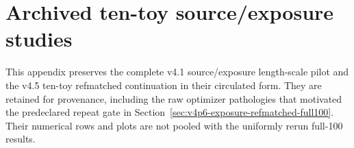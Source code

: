 \clearpage
\section{Archived ten-toy source/exposure studies}
\label{app:v4p5-ten-toy-source-exposure}

This appendix preserves the complete v4.1 source/exposure length-scale pilot and the
v4.5 ten-toy refmatched continuation in their circulated form.  They are retained for
provenance, including the raw optimizer pathologies that motivated the predeclared
repeat gate in Section~\ref{sec:v4p6-exposure-refmatched-full100}.  Their numerical
rows and plots are not pooled with the uniformly rerun full-100 results.

\vfourpfivepilotappendix
